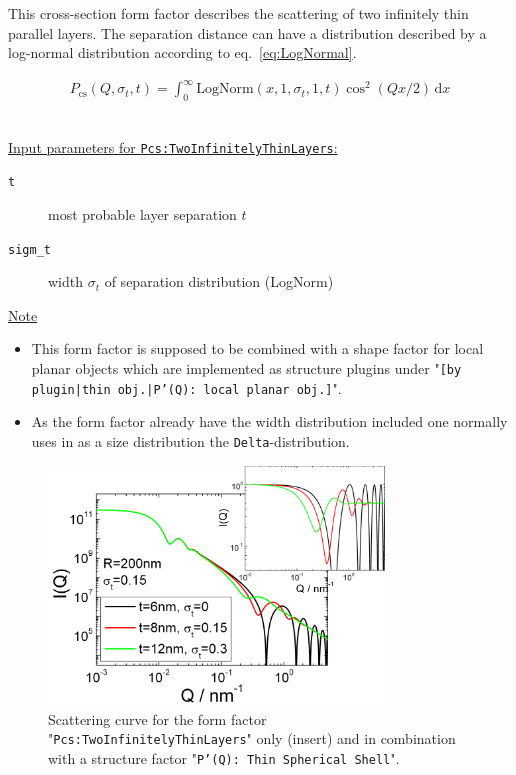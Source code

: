 This cross-section form factor describes the scattering of two infinitely thin parallel layers.
The separation distance can have a distribution described by a log-normal distribution according
to eq.\ \ref{eq:LogNormal}.

\begin{align}
P_\text{cs}(Q,\sigma_{t},t) = \int_0^\infty \textrm{LogNorm}(x,1,\sigma_{t},1,t) \cos^2(Qx/2) \, \textrm{d}x
\end{align}

\vspace{5mm}

\hspace{1pt}\\
\uline{Input parameters for \texttt{Pcs:TwoInfinitelyThinLayers}:}
\begin{description}
    \item[\texttt{t}] most probable layer separation $t$
    \item[\texttt{sigm\_t}] width $\sigma_t$ of separation distribution (LogNorm)
\end{description}

\noindent
\uline{Note}
\begin{itemize}
  \item This form factor is supposed to be combined with a shape factor for
local planar objects which are implemented as structure  plugins
under "\texttt{[by plugin|thin obj.|P'(Q): local planar
obj.]}".
\item As the form factor already have the width distribution included one normally uses in \SASfit as a size distribution
the \texttt{Delta}-distribution.
\end{itemize}

\begin{figure}[htb]
\begin{center}
\includegraphics[width=0.8\textwidth,height=0.55\textwidth]{../images/form_factor/anisotropic/planar2thinIQ.png}
\end{center}
\caption{Scattering curve for the form factor "\texttt{Pcs:TwoInfinitelyThinLayers}" only (insert) and
in combination with a structure factor "\texttt{P'(Q): Thin Spherical Shell}".}
\label{fig_IQ:Pcs:TwoInfinitelyThinLayers}
\end{figure}


